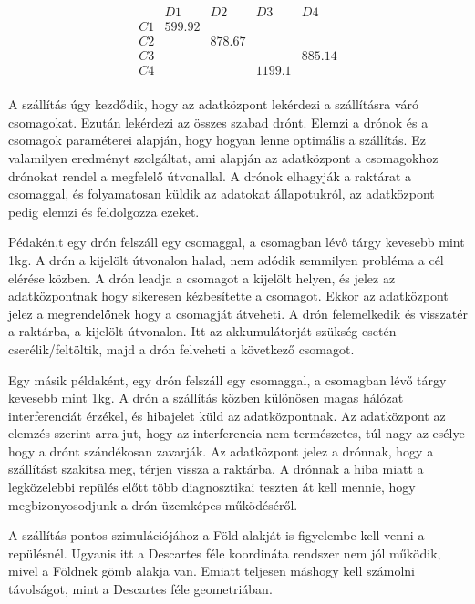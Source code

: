 \[
    \begin{matrix}
        & D1 & D2 & D3 & D4 \\
        C1 & 599.92 &  &  &  \\
        C2 &  & 878.67 & & \\
        C3 &  &  &  & 885.14 \\
        C4 &  &  & 1199.1 &  \\
    \end{matrix}
\]



A szállítás úgy kezdődik, hogy az adatközpont lekérdezi a szállításra váró csomagokat.
Ezután lekérdezi az összes szabad drónt.
Elemzi a drónok és a csomagok paraméterei alapján, hogy hogyan lenne optimális a szállítás.
Ez valamilyen eredményt szolgáltat, ami alapján az adatközpont a csomagokhoz drónokat rendel a megfelelő útvonallal.
A drónok elhagyják a raktárat a csomaggal, és folyamatosan küldik az adatokat állapotukról, az adatközpont pedig elemzi és feldolgozza ezeket.

Pédakén,t egy drón felszáll egy csomaggal, a csomagban lévő tárgy kevesebb mint 1kg.
A drón a kijelölt útvonalon halad, nem adódik semmilyen probléma a cél elérése közben.
A drón leadja a csomagot a kijelölt helyen, és jelez az adatközpontnak hogy sikeresen kézbesítette a csomagot.
Ekkor az adatközpont jelez a megrendelőnek hogy a csomagját átveheti.
A drón felemelkedik és visszatér a raktárba, a kijelölt útvonalon.
Itt az akkumulátorját szükség esetén cserélik/feltöltik, majd a drón felveheti a következő csomagot.

Egy másik példaként, egy drón felszáll egy csomaggal, a csomagban lévő tárgy kevesebb mint 1kg.
A drón a szállítás közben különösen magas hálózat interferenciát érzékel, és hibajelet küld az adatközpontnak.
Az adatközpont az elemzés szerint arra jut, hogy az interferencia nem természetes, túl nagy az esélye hogy a drónt szándékosan zavarják.
Az adatközpont jelez a drónnak, hogy a szállítást szakítsa meg, térjen vissza a raktárba.
A drónnak a hiba miatt a legközelebbi repülés előtt több diagnosztikai teszten át kell mennie, hogy megbizonyosodjunk a drón üzemképes működéséről.



A szállítás pontos szimulációjához a Föld alakját is figyelembe kell venni a repülésnél.
Ugyanis itt a Descartes féle koordináta rendszer nem jól működik, mivel a Földnek gömb alakja van.
Emiatt teljesen máshogy kell számolni távolságot, mint a Descartes féle geometriában.
